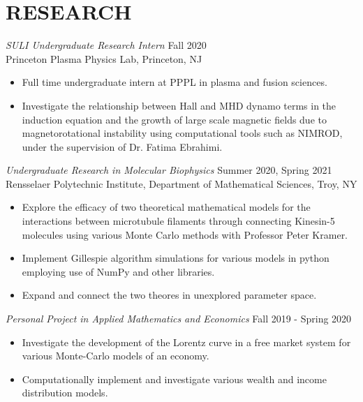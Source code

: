 \documentclass[margin]{rpires}
\begin{document}
\begin{resume}
\begin{ncolumn}{2}
		\end{ncolumn}


\section{RESEARCH}      
    {\sl SULI Undergraduate Research Intern} \hfill Fall 2020 \\
    Princeton Plasma Physics Lab, 
    Princeton, NJ 
    \begin{itemize}  \itemsep -2pt %
    \item Full time undergraduate intern at PPPL in plasma and fusion sciences.
    \item   Investigate the relationship between Hall and MHD dynamo terms in the induction equation and the growth of large scale magnetic fields due to magnetorotational instability using computational tools such as NIMROD, under the supervision of Dr. Fatima Ebrahimi. 
    \end{itemize}

    {\sl Undergraduate Research in Molecular Biophysics} \hfill Summer 2020, Spring 2021 \\
    Rensselaer Polytechnic Institute, 
    Department of Mathematical Sciences, Troy, NY 
    \begin{itemize}  \itemsep -2pt %
    \item Explore the efficacy of two theoretical mathematical models for the interactions between microtubule filaments through connecting
    Kinesin-5 molecules using various Monte Carlo methods with Professor Peter Kramer.
    \item Implement Gillespie algorithm simulations for various models in python employing use of NumPy and other libraries. 
    \item   Expand and connect the two theores in unexplored parameter space.
    \end{itemize}

    {\sl Personal Project in Applied Mathematics and Economics} \hfill Fall 2019 - Spring 2020
    \begin{itemize}  \itemsep -2pt %
        \item Investigate the development of the Lorentz curve in a free market system for various Monte-Carlo models of an economy.
        \item Computationally implement and investigate various wealth and income distribution models.
    \end{itemize}


\end{resume}
\end{document}
